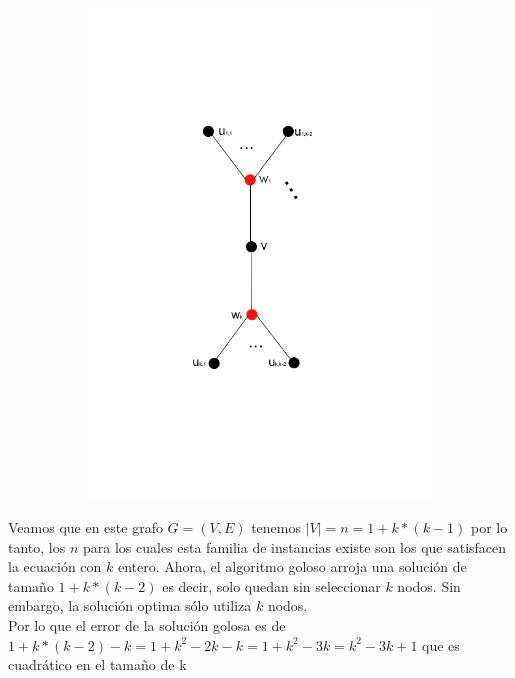 \begin{figure}[H]
\centering
\begin{subfigure}[b]{0.5\textwidth}
                \includegraphics[width=\textwidth]{imagenes/grafos-ej3-tp3-3.png}
                \caption{}
        \end{subfigure}%
\end{figure}


Veamos que en este grafo $G=(V,E)$ tenemos $|V| = n = 1 + k*(k-1)$ por lo tanto, los $n$ para los cuales esta familia de instancias existe son los que satisfacen la ecuación con $k$ entero. Ahora, el algoritmo goloso arroja una solución de tamaño $1 + k*(k-2)$ es decir, solo quedan sin seleccionar $k$ nodos. Sin embargo, la solución optima sólo utiliza $k$ nodos.\\

Por lo que el error de la solución golosa es de $1 + k*(k-2) - k = 1 + k^2 -2k -k = 1 + k^2 - 3k = k^2 - 3k + 1$ que es cuadrático en el tamaño de k

